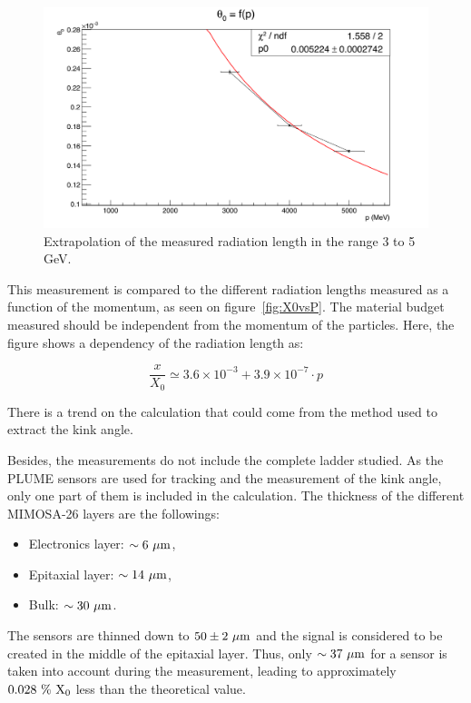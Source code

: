    \begin{figure}[!h]
     \centering
     \includegraphics[width = \textwidth]{Pictures/X0/theta0VsP_3-5GeV.png}
     \caption{Extrapolation of the measured radiation length in the range 3 to 5 GeV.}
     \label{fig:theta0vsP_3-5}
   \end{figure}

   This measurement is compared to the different radiation lengths measured as a function of the momentum, as seen on figure~\ref{fig:X0vsP}.
   The material budget measured should be independent from the momentum of the particles.
   Here, the figure shows a dependency of the radiation length as: 

   \begin{equation}
     \frac{x}{X_0} \simeq 3.6 \times 10^{-3} + 3.9 \times 10^{-7}\cdot p
   \end{equation}

   There is a trend on the calculation that could come from the method used to extract the kink angle.

   Besides, the measurements do not include the complete ladder studied. 
   As the \gls{PLUME} sensors are used for tracking and the measurement of the kink angle, only one part of them is included in the calculation.
   The thickness of the different \gls{MIMOSA}-26 layers are the followings: 
   \begin{itemize}
     \item Electronics layer: $\sim 6~\rm{\mu m}$,
     \item Epitaxial layer: $\sim 14~\rm{\mu m}$,
     \item Bulk: $\sim 30~\rm{\mu m}$.
   \end{itemize}
   The sensors are thinned down to $50 \pm 2~\rm{\mu m}$ and the signal is considered to be created in the middle of the epitaxial layer. 
   Thus, only $\sim 37~\rm{\mu m}$ for a sensor is taken into account during the measurement, leading to approximately $0.028~\%~\rm{X_{0}}$ less than the theoretical value.

